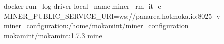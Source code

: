 \begin{shellcommandbox}\begin{ttlst}
docker run --log-driver local --name miner --rm -it -e MINER_PUBLIC_SERVICE_URI=ws://panarea.hotmoka.io:8025 -v miner_configuration:/home/mokamint/miner_configuration mokamint/mokamint:1.7.3 mine
\end{ttlst}\end{shellcommandbox}
